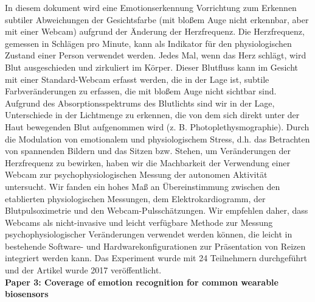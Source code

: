 In diesem dokument wird eine Emotionserkennung  Vorrichtung zum Erkennen subtiler Abweichungen der Gesichtsfarbe (mit bloßem Auge nicht erkennbar, aber mit einer Webcam) aufgrund der Änderung der Herzfrequenz. 
Die Herzfrequenz, gemessen in Schlägen pro Minute, kann als Indikator für den physiologischen Zustand einer Person verwendet werden. 
Jedes Mal, wenn das Herz schlägt, wird Blut ausgeschieden und zirkuliert im Körper. 
Dieser Blutfluss kann im Gesicht mit einer Standard-Webcam erfasst werden, die in der Lage ist, subtile Farbveränderungen zu erfassen, die mit bloßem Auge nicht sichtbar sind. 
Aufgrund des Absorptionsspektrums des Blutlichts sind wir in der Lage, Unterschiede in der Lichtmenge zu erkennen, die von dem sich direkt unter der Haut bewegenden Blut aufgenommen wird (z. B. Photoplethysmographie). 
Durch die Modulation von emotionalem und physiologischem Stress, d.h. das Betrachten von spannenden Bildern und das Sitzen bzw. Stehen, um Veränderungen der Herzfrequenz zu bewirken, haben wir die Machbarkeit der Verwendung einer Webcam zur psychophysiologischen Messung der autonomen Aktivität untersucht. 
Wir fanden ein hohes Maß an Übereinstimmung zwischen den etablierten physiologischen Messungen, dem Elektrokardiogramm, der Blutpulsoximetrie und den Webcam-Pulsschätzungen. 
Wir empfehlen daher, dass Webcams als nicht-invasive und leicht verfügbare Methode zur Messung psychophysiologischer Veränderungen verwendet werden können, die leicht in bestehende Software- und Hardwarekonfigurationen zur Präsentation von Reizen integriert werden kann. 
Das Experiment wurde mit 24 Teilnehmern durchgeführt und der Artikel wurde 2017 veröffentlicht. \\


\textbf{Paper 3: Coverage of emotion recognition for common wearable biosensors}

